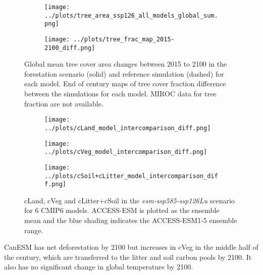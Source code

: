 \documentclass[]{article}
\begin{document}
\begin{figure}[H]
    \centering
    \begin{subfigure}[b]{0.9\linewidth}
        \texttt{[image: ../plots/tree\_area\_ssp126\_all\_models\_global\_sum.png]}
    \end{subfigure}
    \begin{subfigure}[b]{0.9\linewidth}
        \texttt{[image: ../plots/tree\_frac\_map\_2015-2100\_diff.png]}
    \end{subfigure}
    \caption{Global mean tree cover area changes between 2015 to 2100 in the forestation scenario (solid) and reference simulation (dashed) for each model. End of century maps of tree cover fraction difference between the simulations for each model. MIROC data for tree fraction are not available.}
    \label{fig:land_use_map}
\end{figure}

\begin{figure}[H]
    \centering
    \begin{subfigure}[b]{0.45\linewidth}
        \texttt{[image: ../plots/cLand\_model\_intercomparison\_diff.png]}
    \end{subfigure}
    \begin{subfigure}[b]{0.45\linewidth}
        \texttt{[image: ../plots/cVeg\_model\_intercomparison\_diff.png]}
    \end{subfigure}
    \begin{subfigure}[b]{0.45\linewidth}
        \texttt{[image: ../plots/cSoil+cLitter\_model\_intercomparison\_diff.png]}
    \end{subfigure}
    \caption{cLand, cVeg and cLitter+cSoil in the \textit{esm-ssp585-ssp126Lu} scenario for 6 CMIP6 models. ACCESS-ESM is plotted as the ensemble mean and the blue shading indicates the ACCESS-ESM1-5 ensemble range.}
    \label{fig:models_cpools}
\end{figure}

CanESM has net deforestation by 2100 but increases in cVeg in the middle half of the century, which are transferred to the litter and soil carbon pools by 2100.
It also has no significant change in global temperature by 2100.
\end{document}
